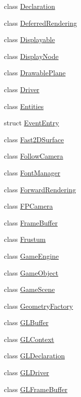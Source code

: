 \begin{DoxyCompactItemize}
\item 
class \hyperlink{class_agmd_1_1_declaration}{Declaration}
\item 
class \hyperlink{class_agmd_1_1_deferred_rendering}{Deferred\+Rendering}
\item 
class \hyperlink{class_agmd_1_1_displayable}{Displayable}
\item 
class \hyperlink{class_agmd_1_1_display_node}{Display\+Node}
\item 
class \hyperlink{class_agmd_1_1_drawable_plane}{Drawable\+Plane}
\item 
class \hyperlink{class_agmd_1_1_driver}{Driver}
\item 
class \hyperlink{class_agmd_1_1_entities}{Entities}
\item 
struct \hyperlink{struct_agmd_1_1_event_entry}{Event\+Entry}
\item 
class \hyperlink{class_agmd_1_1_fast2_d_surface}{Fast2\+D\+Surface}
\item 
class \hyperlink{class_agmd_1_1_follow_camera}{Follow\+Camera}
\item 
class \hyperlink{class_agmd_1_1_font_manager}{Font\+Manager}
\item 
class \hyperlink{class_agmd_1_1_forward_rendering}{Forward\+Rendering}
\item 
class \hyperlink{class_agmd_1_1_f_p_camera}{F\+P\+Camera}
\item 
class \hyperlink{class_agmd_1_1_frame_buffer}{Frame\+Buffer}
\item 
class \hyperlink{class_agmd_1_1_frustum}{Frustum}
\item 
class \hyperlink{class_agmd_1_1_game_engine}{Game\+Engine}
\item 
class \hyperlink{class_agmd_1_1_game_object}{Game\+Object}
\item 
class \hyperlink{class_agmd_1_1_game_scene}{Game\+Scene}
\item 
class \hyperlink{class_agmd_1_1_geometry_factory}{Geometry\+Factory}
\item 
class \hyperlink{class_agmd_1_1_g_l_buffer}{G\+L\+Buffer}
\item 
class \hyperlink{class_agmd_1_1_g_l_context}{G\+L\+Context}
\item 
class \hyperlink{class_agmd_1_1_g_l_declaration}{G\+L\+Declaration}
\item 
class \hyperlink{class_agmd_1_1_g_l_driver}{G\+L\+Driver}
\item 
class \hyperlink{class_agmd_1_1_g_l_frame_buffer}{G\+L\+Frame\+Buffer}
\item 

\end{DoxyCompactItemize}
